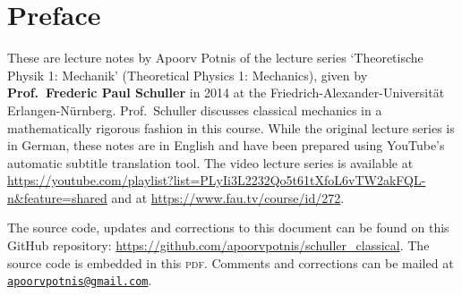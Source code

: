 \documentclass[a4paper, 11pt]{book}
\theoremstyle{definition}
\begin{document}

    \begin{titlepage}
        \maketitle
        \thispagestyle{empty}   %
    \end{titlepage}    
    
    
    \frontmatter

    \hypertarget{Preface}{}
    \chapter*{Preface}
    
    These are lecture notes by Apoorv Potnis of the lecture series `Theoretische Physik 1: Mechanik' (Theoretical Physics 1: Mechanics), given by \textbf{Prof.\ Frederic Paul Schuller} in 2014 at the Friedrich-Alexander-Universität Erlangen-Nürnberg. Prof.\ Schuller discusses classical mechanics in a mathematically rigorous fashion in this course. While the original lecture series is in German, these notes are in English and have been prepared using YouTube's automatic subtitle translation tool. The video lecture series is available at \url{https://youtube.com/playlist?list=PLyIi3L2232Qo5t61tXfoL6vTW2akFQL-n&feature=shared} and at \url{https://www.fau.tv/course/id/272}.

    The source code, updates and corrections to this document can be found on this GitHub repository: \url{https://github.com/apoorvpotnis/schuller_classical}. The source code is embedded in this \textsc{pdf}. Comments and corrections can be mailed at \href{mailto:apoorvpotnis@gmail.com}{\texttt{apoorvpotnis@gmail.com}}.

    \clearpage
    
    \cleardoublepage      %
    \tableofcontents
    
\end{document}
